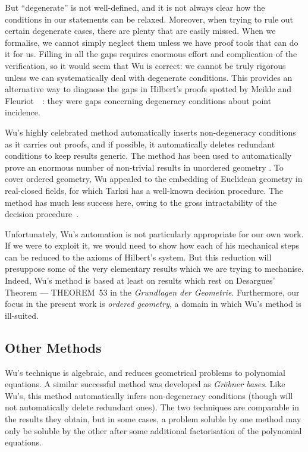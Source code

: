 But ``degenerate'' is not well-defined, and it is not always clear how the conditions in our statements can be relaxed. Moreover, when trying to rule out certain degenerate cases, there are plenty that are easily missed. When we formalise, we cannot simply neglect them unless we have proof tools that can do it for us. Filling in all the gaps requires enormous effort and complication of the verification, so it would seem that Wu is correct: we cannot be truly rigorous unless we can systematically deal with degenerate conditions. This provides an alternative way to diagnose the gaps in Hilbert's proofs spotted by Meikle and Fleuriot~~\cite{MeikleFleuriotFormalizingHilbert}: they were gaps concerning degeneracy conditions about point incidence.

Wu's highly celebrated method automatically inserts non-degeneracy conditions as it carries out proofs, and if possible, it automatically deletes redundant conditions to keep results generic. The method has been used to automatically prove an enormous number of non-trivial results in unordered geometry \cite{MechanicalGeometryTheoremProving}. To cover ordered geometry, Wu appealed to the embedding of Euclidean geometry in real-closed fields, for which Tarksi has a well-known decision procedure. The method has much less success here, owing to the gross intractability of the decision procedure~\cite{TarksiMcNaugtonReview}. 

Unfortunately, Wu's automation is not particularly appropriate for our own work. If we were to exploit it, we would need to show how each of his mechanical steps can be reduced to the axioms of Hilbert's system. But this reduction will presuppose some of the very elementary results which we are trying to mechanise. Indeed, Wu's method is based at least on results which rest on Desargues' Theorem --- THEOREM~53 in the \emph{Grundlagen der Geometrie}. Furthermore, our focus in the present work is \emph{ordered geometry}, a domain in which Wu's method is ill-suited.

\subsection{Other Methods}
Wu's technique is algebraic, and reduces geometrical problems to polynomial equations. A similar successful method was developed as \emph{Gr\"{o}bner bases}\cite{BuchbergerGrobner}. Like Wu's, this method automatically infers non-degeneracy conditions (though will not automatically delete redundant ones). The two techniques are comparable in the results they obtain, but in some cases, a problem soluble by one method may only be soluble by the other after some additional factorisation of the polynomial equations.

